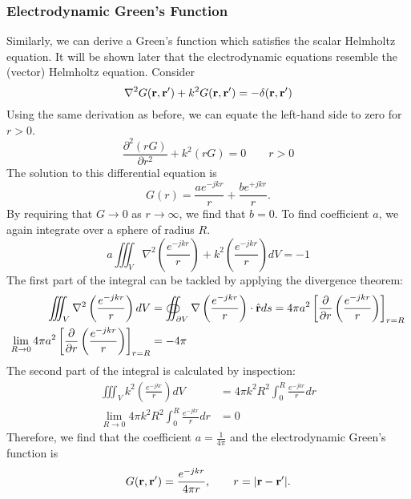 \subsubsection{Electrodynamic Green's Function}
Similarly, we can derive a Green's function which satisfies the scalar Helmholtz equation. It will be shown later that the electrodynamic equations resemble the (vector) Helmholtz equation. Consider
\begin{equation}
	\nabla^2 G(\mathbf{r}, \mathbf{r}^\prime) + k^2 G(\mathbf{r}, \mathbf{r}^\prime) = -\delta(\mathbf{r}, \mathbf{r}^\prime)
\end{equation}
Using the same derivation as before, we can equate the left-hand side to zero for $r > 0$.
\begin{equation}
	\frac{\partial^2 (r G)}{\partial r^2} + k^2 (r G) = 0 \qquad r > 0
\end{equation}
The solution to this differential equation is
\begin{equation*}
	G(r) = \frac{a e^{-j k r}}{r} + \frac{b e^{+j k r}}{r}.
\end{equation*}
By requiring that $G \to 0$ as $r \to \infty$, we find that $b = 0$. To find coefficient $a$, we again integrate over a sphere of radius $R$.
\begin{equation*}
	a \iiint_V \nabla^2 \left( \frac{e^{-jkr}}{r} \right) + k^2 \left( \frac{e^{-jkr}}{r} \right) dV = -1
\end{equation*}
The first part of the integral can be tackled by applying the divergence theorem:
\begin{align*}
	\iiint_V \nabla^2 \left( \frac{e^{-jkr}}{r} \right) dV & = \oiint_{\partial V} \nabla \left( \frac{e^{-jkr}}{r} \right) \cdot \hat{\mathbf{r}} ds = 4\pi a^2 \left[ \frac{\partial}{\partial r} \left( \frac{e^{-jkr}}{r} \right) \right]_{r = R} \\
	\lim_{R \to 0} 4\pi a^2 \left[ \frac{\partial}{\partial r} \left( \frac{e^{-jkr}}{r} \right) \right]_{r = R} & = -4\pi
\end{align*}
The second part of the integral is calculated by inspection:
\begin{align*}
	\iiint_V k^2 \left( \frac{e^{-jkr}}{r} \right) dV & = 4\pi k^2 R^2 \int_0^R \frac{e^{-jkr}}{r} dr \\
	\lim_{R \to 0} 4\pi k^2 R^2 \int_0^R \frac{e^{-jkr}}{r} dr & = 0
\end{align*}
Therefore, we find that the coefficient $a = \frac{1}{4\pi}$ and the electrodynamic Green's function is
\begin{equation}
	G(\mathbf{r}, \mathbf{r}^\prime) = \frac{e^{-jkr}}{4\pi r}, \qquad r = |\mathbf{r} - \mathbf{r}^\prime|.
\end{equation}

